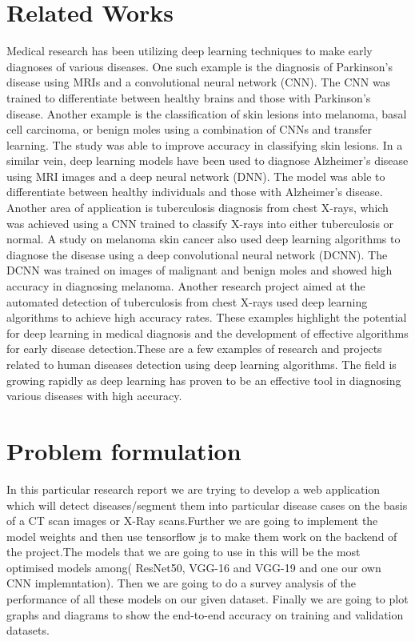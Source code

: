 \documentclass[journal]{IEEEtran}
\begin{document}
\section{Related Works}
Medical research has been utilizing deep learning techniques to make early diagnoses of various diseases. One such example is the diagnosis of Parkinson's disease using MRIs and a convolutional neural network (CNN). The CNN was trained to differentiate between healthy brains and those with Parkinson's disease. Another example is the classification of skin lesions into melanoma, basal cell carcinoma, or benign moles using a combination of CNNs and transfer learning. The study was able to improve accuracy in classifying skin lesions. In a similar vein, deep learning models have been used to diagnose Alzheimer's disease using MRI images and a deep neural network (DNN). The model was able to differentiate between healthy individuals and those with Alzheimer's disease. Another area of application is tuberculosis diagnosis from chest X-rays, which was achieved using a CNN trained to classify X-rays into either tuberculosis or normal. A study on melanoma skin cancer also used deep learning algorithms to diagnose the disease using a deep convolutional neural network (DCNN). The DCNN was trained on images of malignant and benign moles and showed high accuracy in diagnosing melanoma. Another research project aimed at the automated detection of tuberculosis from chest X-rays used deep learning algorithms to achieve high accuracy rates. These examples highlight the potential for deep learning in medical diagnosis and the development of effective algorithms for early disease detection.These are a few examples of research and projects related to human diseases detection using deep learning algorithms. The field is growing rapidly as deep learning has proven to be an effective tool in diagnosing various diseases with high accuracy.

\section{Problem formulation}
\label{PF}
In this particular research report we are trying to develop a web application which will detect diseases/segment them into particular disease cases on the basis of a CT scan images or X-Ray scans.Further we are going to implement the model weights and then use tensorflow js to make them work on the backend of the project.The models that we are going to use in this will be the most optimised models among( ResNet50, VGG-16 and VGG-19 and one our own CNN implemntation). Then we are going to do a survey analysis of the performance of all these models on our given dataset. Finally we are going to plot graphs and diagrams to show the end-to-end accuracy on training and validation datasets.
\end{document}
